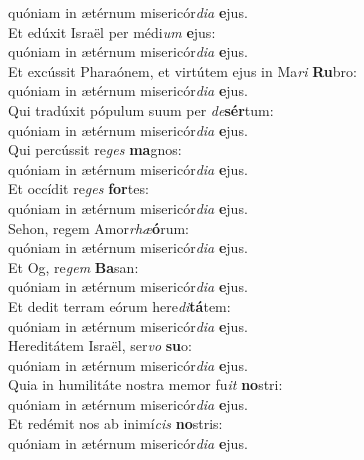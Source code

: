 \oddverse quóniam in ætérnum misericór\textit{di}\textit{a} \textbf{e}jus.\\
\evenverse Et edúxit Israël per médi\textit{um} \textbf{e}jus:~\*\\
\evenverse quóniam in ætérnum misericór\textit{di}\textit{a} \textbf{e}jus.\\
\oddverse Et excússit Pharaónem, et virtútem ejus in Ma\textit{ri} \textbf{Ru}bro:~\*\\
\oddverse quóniam in ætérnum misericór\textit{di}\textit{a} \textbf{e}jus.\\
\evenverse Qui tradúxit pópulum suum per \textit{de}\textbf{sér}tum:~\*\\
\evenverse quóniam in ætérnum misericór\textit{di}\textit{a} \textbf{e}jus.\\
\oddverse Qui percússit re\textit{ges} \textbf{ma}gnos:~\*\\
\oddverse quóniam in ætérnum misericór\textit{di}\textit{a} \textbf{e}jus.\\
\evenverse Et occídit re\textit{ges} \textbf{for}tes:~\*\\
\evenverse quóniam in ætérnum misericór\textit{di}\textit{a} \textbf{e}jus.\\
\oddverse Sehon, regem Amor\textit{rhæ}\textbf{ó}rum:~\*\\
\oddverse quóniam in ætérnum misericór\textit{di}\textit{a} \textbf{e}jus.\\
\evenverse Et Og, re\textit{gem} \textbf{Ba}san:~\*\\
\evenverse quóniam in ætérnum misericór\textit{di}\textit{a} \textbf{e}jus.\\
\oddverse Et dedit terram eórum here\textit{di}\textbf{tá}tem:~\*\\
\oddverse quóniam in ætérnum misericór\textit{di}\textit{a} \textbf{e}jus.\\
\evenverse Hereditátem Israël, ser\textit{vo} \textbf{su}o:~\*\\
\evenverse quóniam in ætérnum misericór\textit{di}\textit{a} \textbf{e}jus.\\
\oddverse Quia in humilitáte nostra memor fu\textit{it} \textbf{no}stri:~\*\\
\oddverse quóniam in ætérnum misericór\textit{di}\textit{a} \textbf{e}jus.\\
\evenverse Et redémit nos ab inimí\textit{cis} \textbf{no}stris:~\*\\
\evenverse quóniam in ætérnum misericór\textit{di}\textit{a} \textbf{e}jus.\\
